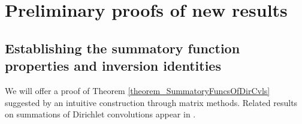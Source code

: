 \documentclass[11pt,reqno,a4letter]{article}
\numberwithin{figure}{section}
\numberwithin{table}{section}
\newcommand{\cf}{\textit{cf.\ }}
\theoremstyle{plain}
\numberwithin{theorem}{section}
\theoremstyle{definition}
\begin{document}
\newpage 
\section{Preliminary proofs of new results} 
\label{Section_PrelimProofs_Config} 

\subsection{Establishing the summatory function properties and inversion identities} 

We will offer a proof of Theorem \ref{theorem_SummatoryFuncsOfDirCvls} 
suggested by an intuitive construction through matrix methods. 
Related results on summations of Dirichlet convolutions appear in 
\cite[\S 2.14; \S 3.10; \S 3.12; \cf \S 4.9, p.\ 95]{APOSTOLANUMT}. 
\end{document}
